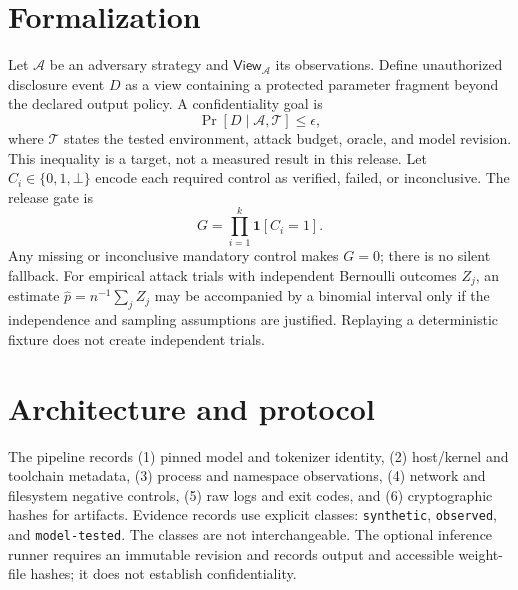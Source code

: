 \documentclass[10pt]{article}
\begin{document}
\section{Formalization}
Let $\mathcal{A}$ be an adversary strategy and $\mathsf{View}_{\mathcal{A}}$ its observations. Define unauthorized disclosure event $D$ as a view containing a protected parameter fragment beyond the declared output policy. A confidentiality goal is
\[
\Pr[D\mid\mathcal{A},\mathcal{T}]\leq\epsilon,
\]
where $\mathcal{T}$ states the tested environment, attack budget, oracle, and model revision. This inequality is a target, not a measured result in this release. Let $C_i\in\{0,1,\bot\}$ encode each required control as verified, failed, or inconclusive. The release gate is
\[
G=\prod_{i=1}^{k}\mathbf{1}[C_i=1].
\]
Any missing or inconclusive mandatory control makes $G=0$; there is no silent fallback. For empirical attack trials with independent Bernoulli outcomes $Z_j$, an estimate $\hat p=n^{-1}\sum_j Z_j$ may be accompanied by a binomial interval only if the independence and sampling assumptions are justified. Replaying a deterministic fixture does not create independent trials.
\section{Architecture and protocol}
The pipeline records (1) pinned model and tokenizer identity, (2) host/kernel and toolchain metadata, (3) process and namespace observations, (4) network and filesystem negative controls, (5) raw logs and exit codes, and (6) cryptographic hashes for artifacts. Evidence records use explicit classes: \texttt{synthetic}, \texttt{observed}, and \texttt{model-tested}. The classes are not interchangeable. The optional inference runner requires an immutable revision and records output and accessible weight-file hashes; it does not establish confidentiality.
\end{document}
